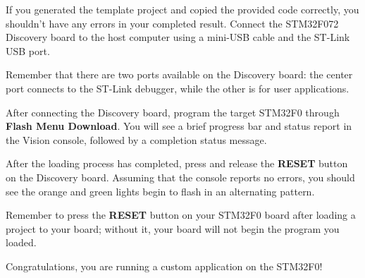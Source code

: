 \documentclass[openany,11pt,fleqn]{book} %
\begin{document}
If you generated the template project and copied the provided code correctly, you shouldn't have any errors in your completed result. Connect the STM32F072 Discovery board to the host computer using a mini-USB cable and the ST-Link USB port. 

\begin{warning}
	Remember that there are two ports available on the Discovery board: the center port connects to the ST-Link debugger, while the other is for user applications.
\end{warning}

After connecting the Discovery board, program the target STM32F0 through \textbf{Flash Menu \textrightarrow Download}. You will see a brief progress bar and status report in the {\textmu}Vision console, followed by a completion status message. 

After the loading process has completed, press and release the \textbf{RESET} button on the Discovery board. Assuming that the console reports no errors, you should see the orange and green lights begin to flash in an alternating pattern. \\

\begin{warning}
	Remember to press the \textbf{RESET} button on your STM32F0 board after loading a project to your board; without it, your board will not begin the program you loaded.
\end{warning}

Congratulations, you are running a custom application on the STM32F0! 




\end{document}
